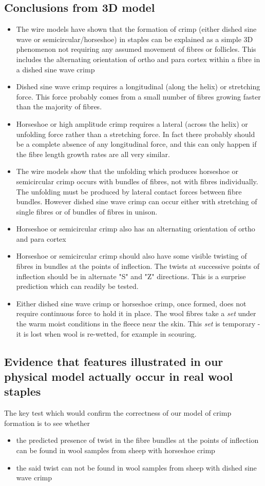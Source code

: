 \documentclass[titlepage,10pt]{article}  %
\begin{document}
\subsection{Conclusions from 3D model}
\begin{itemize}
\item  The wire models have shown that the formation of crimp (either dished sine wave or semicircular/horseshoe) in staples can be explained as a simple 3D phenomenon not requiring any assumed movement of fibres or follicles. This includes the alternating orientation of ortho and para cortex within a fibre in a dished sine wave crimp
\item Dished sine wave crimp requires a longitudinal (along the helix) or stretching force. This force probably comes from a small number of fibres growing faster than the majority of fibres. 
\item Horseshoe or high amplitude crimp requires a  lateral (across the helix) or unfolding force rather than a stretching force. In fact there probably should be a complete absence of any longitudinal force, and this can only happen if the fibre length growth rates are all very similar.
\item The wire models show that the unfolding which produces horseshoe or semicircular crimp occurs with bundles of fibres, not with fibres individually. The unfolding must be produced by lateral  contact forces between fibre bundles. However dished sine wave crimp can occur either with stretching of single fibres or of bundles of fibres in unison.
\item Horseshoe or semicircular crimp also has an alternating orientation of ortho and para cortex
\item Horseshoe or semicircular crimp should also have some visible twisting of fibres in bundles at the points of inflection. The twists at successive points of inflection should be in alternate "S" and "Z" directions. This is a surprise prediction which can readily be tested.
\item Either dished sine wave crimp or horseshoe crimp, once formed, does not require continuous force to hold it in place. The wool fibres take a {\em set} under the warm moist conditions in the fleece near the skin. This {\em set} is temporary - it is lost when wool is re-wetted, for example in scouring.
\end{itemize}
 
\subsection{Evidence that features illustrated in our physical model actually occur in real wool staples}
\label{sec:evid1}
The key test which would confirm the correctness of our model of  crimp formation is to see whether
\begin{itemize}
\item  the predicted presence of twist in the fibre bundles at the points of inflection can be found in wool samples from sheep with horseshoe crimp 
\item  the said twist can not be found in wool samples from sheep with dished sine wave crimp
\end{itemize}
\end{document}
